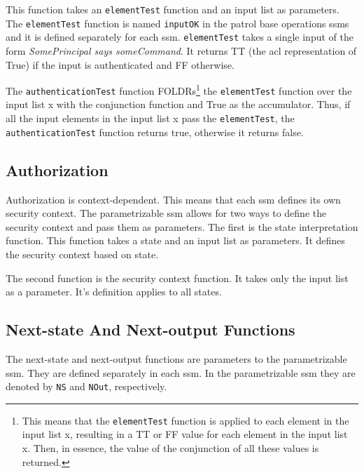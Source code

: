 \documentclass[../../main/main.tex]{subfiles}
\begin{document}
This function takes an \texttt{elementTest} function and an input list as parameters.  The \texttt{elementTest} function is named \texttt{inputOK} in the patrol base operations \glspl{ssm} and it is defined separately for each \gls{ssm}.  \texttt{elementTest} takes a single input of the form \textit{SomePrincipal says someCommand}.  It returns TT (the \gls{acl} representation of True) if the input is authenticated and FF otherwise.  

The \texttt{authenticationTest} function FOLDRs\footnote{This means that the \texttt{elementTest} function is applied to each element in the input list x, resulting in a TT or FF value for each element in the input list x.   Then, in essence, the value of the conjunction of all these values is returned.} the \texttt{elementTest} function over the input list x with the conjunction function and True as the accumulator.  Thus, if all the input elements in the input list x pass the \texttt{elementTest}, the \texttt{authenticationTest} function returns true, otherwise it returns false.  
     
\subsection{Authorization}
Authorization is context-dependent. This means that each \gls{ssm} defines its own security context.  The parametrizable \gls{ssm} allows for two ways to define the security context and pass them as parameters.  The first is the state interpretation function. This function takes a state and an input list as parameters.  It defines the security context based on state. 

The second function is the security context function.  It takes only the input list as a parameter.  It's definition applies to all states.

\subsection{Next-state And Next-output Functions}
The next-state and next-output functions are parameters to the parametrizable \gls{ssm}.  They are defined separately in each \gls{ssm}.  In the parametrizable \gls{ssm} they are denoted by \texttt{NS} and \texttt{NOut}, respectively.
\end{document}
